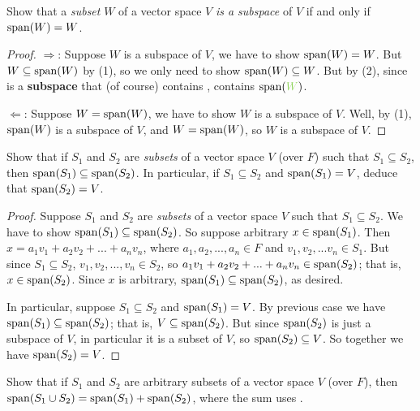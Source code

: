 \begin{exercise} \label{exercise 1.4.12}
Show that a \emph{subset} \(W\) of a vector space \(V\) \emph{is a subspace} of \(V\) if and only if \(\operatorname{span}(W) = W\).
\end{exercise}

\begin{proof}
\(\Longrightarrow\): Suppose \(W\) is a subspace of \(V\), we have to show \(\operatorname{span}(W) = W\).
But \(W \subseteq \operatorname{span}(W)\) by (1), so we only need to show \(\operatorname{span}(W) \subseteq W\).
But by (2), since  is a \textbf{subspace} that (of course) contains ,  contains \(\spann(\GREEN{W})\).

\(\Longleftarrow\): Suppose \(W = \operatorname{span}(W)\), we have to show \(W\) is a subspace of \(V\).
Well, by (1), \(\operatorname{span}(W)\) is a subspace of \(V\), and \(W = \operatorname{span}(W)\), so \(W\) is a subspace of \(V\).
\end{proof}

\begin{exercise} \label{exercise 1.4.13}
Show that if \(S_1\) and \(S_2\) are \emph{subsets} of a vector space \(V\) (over \(F\)) such that \(S_1 \subseteq S_2\), then \(\operatorname{span}(S_1) \subseteq \operatorname{span}(S_2)\).
In particular, if \(S_1 \subseteq S_2\) and \(\operatorname{span}(S_1) = V\), deduce that \(\operatorname{span}(S_2) = V\).
\end{exercise}

\begin{proof}
Suppose \(S_1\) and \(S_2\) are \emph{subsets} of a vector space \(V\) such that \(S_1 \subseteq S_2\).
We have to show \(\operatorname{span}(S_1) \subseteq \operatorname{span}(S_2)\).
So suppose arbitrary \(x \in \operatorname{span}(S_1)\).
Then \(x = a_1 v_1 + a_2 v_2 + ... + a_n v_n\), where \(a_1, a_2, ..., a_n \in F\) and \(v_1, v_2, ... v_n \in S_1\).
But since \(S_1 \subseteq S_2\), \(v_1, v_2, ..., v_n \in S_2\), so \(a_1 v_1 + a_2 v_2 + ... + a_n v_n \in \operatorname{span}(S_2)\);
that is, \(x \in \operatorname{span}(S_2)\).
Since \(x\) is arbitrary, \(\operatorname{span}(S_1) \subseteq \operatorname{span}(S_2)\), as desired.

In particular, suppose \(S_1 \subseteq S_2\) and \(\operatorname{span}(S_1) = V\).
By previous case we have \(\operatorname{span}(S_1) \subseteq \operatorname{span}(S_2)\);
that is, \(V \subseteq \operatorname{span}(S_2)\).
But since \(\operatorname{span}(S_2)\) is just a subspace of \(V\), in particular it is a subset of \(V\), so \(\operatorname{span}(S_2) \subseteq V\).
So together we have \(\operatorname{span}(S_2) = V\).
\end{proof}

\begin{exercise} \label{exercise 1.4.14}
Show that if \(S_1\) and \(S_2\) are arbitrary subsets of a vector space \(V\) (over \(F\)), then \(\operatorname{span}(S_1 \cup S_2) = \operatorname{span}(S_1) + \operatorname{span}(S_2)\), where the sum uses .
\end{exercise}

